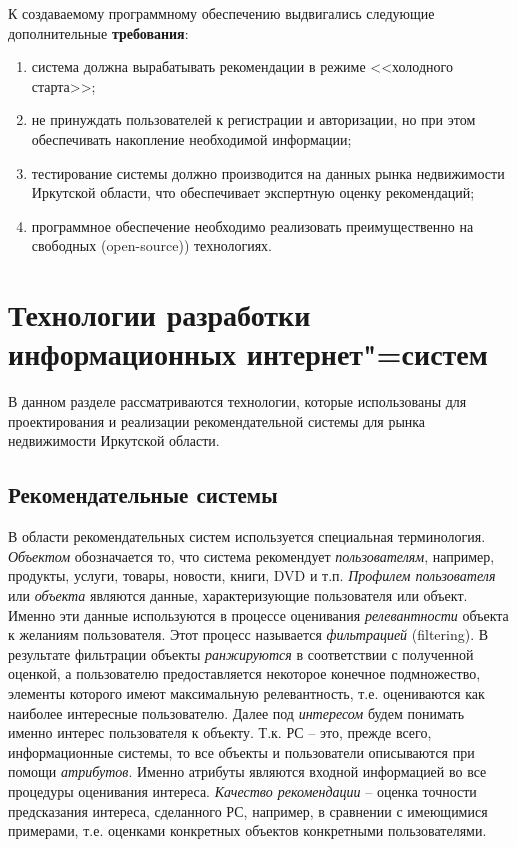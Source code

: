 \documentclass[a4paper,14pt,openany,final]{extreport} %
\begin{document}
К создаваемому программному обеспечению выдвигались следующие дополнительные \textbf{требования}:
\begin{enumerate}
\item система должна вырабатывать рекомендации в режиме <<холодного старта>>;
\item не принуждать пользователей к регистрации и авторизации, но при этом обеспечивать накопление необходимой информации;
\item тестирование системы должно производится на данных рынка недвижимости Иркутской области, что обеспечивает экспертную оценку рекомендаций;
\item программное обеспечение необходимо реализовать преимущественно на свободных (\foreignlanguage{english}{open-source)}) технологиях.
\end{enumerate}

\chapter{Технологии разработки информационных интернет"=систем}
\label{chap:dev-tech-theory}

В данном разделе рассматриваются технологии, которые использованы для проектирования и реализации рекомендательной системы для рынка недвижимости Иркутской области.

\section{Рекомендательные системы}
\label{sec:domain-descr}

В области рекомендательных систем используется специальная терминология. \emph{Объектом} обозначается то, что система рекомендует \emph{пользователям}, например, продукты, услуги, товары, новости, книги, DVD и т.п. \emph{Профилем пользователя} или \emph{объекта} являются данные, характеризующие пользователя или объект. Именно эти данные используются в процессе оценивания \emph{релевантности} объекта к желаниям пользователя. Этот процесс называется \emph{фильтрацией} (\foreignlanguage{english}{filtering}). В результате фильтрации объекты \emph{ранжируются} в соответствии с полученной оценкой, а пользователю предоставляется некоторое конечное подмножество, элементы которого имеют максимальную релевантность, т.е. оцениваются как наиболее интересные пользователю. Далее под \emph{интересом} будем понимать именно интерес пользователя к объекту. Т.к. РС -- это, прежде всего, информационные системы, то все объекты и пользователи описываются при помощи \emph{атрибутов}. Именно атрибуты являются входной информацией во все процедуры оценивания интереса. \emph{Качество рекомендации} -- оценка точности предсказания интереса, сделанного РС, например, в сравнении с имеющимися примерами, т.е. оценками конкретных объектов конкретными пользователями.
\end{document}

